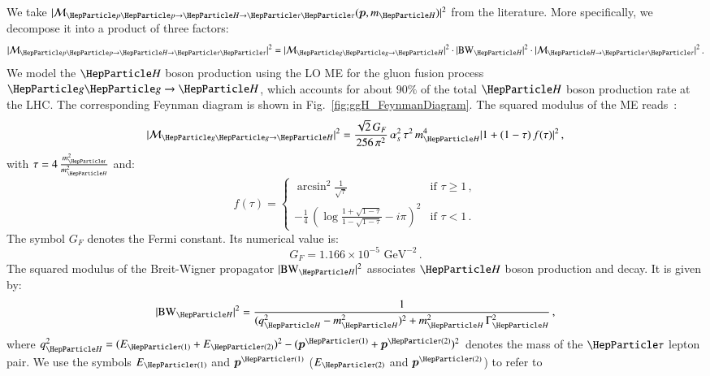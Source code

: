 We take $\vert \mathcal{M}_{\Pp\Pp \to \PHiggs \to
  \Pgt\Pgt}(\bm{p},m_{\PHiggs}) \vert^{2}$ from the literature.
More specifically, we decompose it into a product of three factors:
\begin{equation}
\vert \mathcal{M}_{\Pp\Pp \to \PHiggs \to \Pgt\Pgt} \vert^{2} =
 \vert \mathcal{M}_{\Pg\Pg \to \PHiggs} \vert^{2} 
\cdot \vert \BW_{\PHiggs} \vert^{2} 
\cdot \vert \mathcal{M}_{\PHiggs \to \Pgt\Pgt} \vert^{2} \, .
\label{eq:meHiggsProduction_and_Decay}
\end{equation}
We model the $\PHiggs$ boson production using the LO ME for the gluon fusion process $\Pg\Pg \to \PHiggs$,
which accounts for about $90\%$ of the total $\PHiggs$ boson production rate at the LHC.
The corresponding Feynman diagram is shown in Fig.~\ref{fig:ggH_FeynmanDiagram}.
The squared modulus of the ME reads~\cite{me_ggHprod}:
\begin{equation}
\vert \mathcal{M}_{\Pg\Pg \to \PHiggs} \vert^{2} = 
 \frac{\sqrt{2} \, G_{F}}{256 \, \pi^{2}} \, \alpha_{s}^{2} \, \tau^{2} \, m_{\PHiggs}^{4} \vert 1 + (1 - \tau) \, f(\tau) \vert^{2} \, ,
\label{eq:meHiggsProduction}
\end{equation}
with $\tau = 4\, \frac{m_{\Pqt}^{2}}{m_{\PHiggs}^{2}}$ and:
\begin{equation}
f(\tau) = 
\begin{cases} 
\arcsin^{2} \frac{1}{\sqrt{\tau}}  & \mbox{if } \tau \geq 1 \, , \\
-\frac{1}{4} \, \left( \log\frac{1 + \sqrt{1 - \tau}}{1 - \sqrt{1 - \tau}} - i\pi \right)^{2} & \mbox{if } \tau < 1 \, .
\end{cases}
\label{eq:meHiggsProduction_ftau}
\end{equation}
The symbol $G_{F}$ denotes the Fermi constant. Its numerical value is:
\begin{equation} 
G_{F} = 1.166 \times 10^{-5}\mbox{~GeV}^{-2} \, .
\label{eq:def_G_F} 
\end{equation}
The squared modulus of the Breit-Wigner propagator $\vert \BW_{\PHiggs} \vert^{2}$ associates $\PHiggs$ boson production and decay.
It is given by:
\begin{equation}
\vert \BW_{\PHiggs} \vert^{2} = \frac{1}{(q_{\PHiggs}^{2} -
  m_{\PHiggs}^{2})^{2} + m_{\PHiggs}^{2} \, \Gamma_{\PHiggs}^{2}} \, ,
\label{eq:meHiggsBreitWigner}
\end{equation}
where $q_{\PHiggs}^{2} = (E_{\Pgt(1)} + E_{\Pgt(2)})^{2} - (\bm{p}^{\Pgt(1)} + \bm{p}^{\Pgt(2)})^{2}$ denotes the mass of the $\Pgt$ lepton pair.
We use the symbols $E_{\Pgt(1)}$ and $\bm{p}^{\Pgt(1)}$ ($E_{\Pgt(2)}$ and $\bm{p}^{\Pgt(2)}$) to refer to
